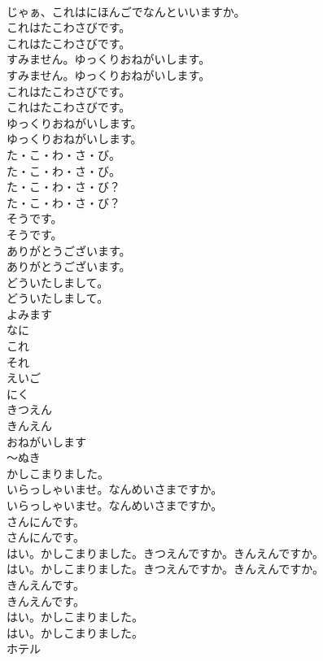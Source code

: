 \documentclass[8pt]{extreport}
\begin{document}
\begin{CJK}{UTF8}{min}
\\	じゃぁ、これはにほんごでなんといいますか。 
\\	これはたこわさびです。	
\\	これはたこわさびです。 
\\	すみません。ゆっくりおねがいします。	
\\	すみません。ゆっくりおねがいします。 
\\	これはたこわさびです。	
\\	これはたこわさびです。 
\\	ゆっくりおねがいします。	
\\	ゆっくりおねがいします。 
\\	た・こ・わ・さ・び。	
\\	た・こ・わ・さ・び。 
\\	た・こ・わ・さ・び？	
\\	た・こ・わ・さ・び？ 
\\	そうです。	
\\	そうです。 
\\	ありがとうございます。	
\\	ありがとうございます。 
\\	どういたしまして。	
\\	どういたしまして。 
\\	よみます
\\	なに
\\	これ
\\	それ
\\	えいご
\\	にく
\\	きつえん
\\	きんえん
\\	おねがいします
\\	～ぬき
\\	かしこまりました。
\\	いらっしゃいませ。なんめいさまですか。	
\\	いらっしゃいませ。なんめいさまですか。 
\\	さんにんです。	
\\	さんにんです。 
\\	はい。かしこまりました。きつえんですか。きんえんですか。	
\\	はい。かしこまりました。きつえんですか。きんえんですか。 
\\	きんえんです。	
\\	きんえんです。 
\\	はい。かしこまりました。	
\\	はい。かしこまりました。 
\\	ホテル

\end{CJK}
\end{document}
